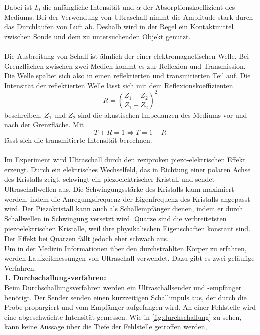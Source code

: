 Dabei ist $I_0$ die anfängliche Intensität und $\alpha$ der Absorptionskoeffizient des Mediums. Bei der Verwendung von Ultraschall nimmt die Amplitude stark durch das 
Durchlaufen von Luft ab. Deshalb wird in der Regel ein Kontaktmittel zwischen Sonde und dem zu untersuchenden Objekt genutzt.\\
\\
Die Ausbreitung von Schall ist ähnlich der einer elektromagnetischen Welle. Bei Grenzflächen zwischen zwei Medien kommt es zur Reflexion und Transmission. Die Welle spaltet 
sich also in einen reflektierten und transmitierten Teil auf. Die Intensität der reflektierten Welle lässt sich mit dem Reflexionskoeffizienten
\begin{equation*}
    R = (\frac{Z_1 - Z_2}{Z_1 + Z_2})^2
\end{equation*}
beschreiben. $Z_1$ und $Z_2$ sind die akustischen Impedanzen des Mediums vor und nach der Grenzfläche. Mit 
\begin{equation*}
    T + R = 1 \Leftrightarrow T = 1 - R
\end{equation*}
lässt sich die transmitierte Intensität berechnen.
\\
\\
Im Experiment wird Ultraschall durch den reziproken piezo-elektrischen Effekt erzeugt. 
Durch ein elektrisches Wechselfeld, das in Richtung einer polaren Achse des Kristalls zeigt, schwingt ein piezoelektrischer Kristall und sendet Ultraschallwellen aus.
Die Schwingungsstärke des Kristalls kann maximiert werden, indem die Anregungsfrequenz der Eigenfrequenz des Kristalls angepasst wird. 
Der Piezokristall kann auch als Schallempfänger dienen, 
indem er durch Schallwellen in Schwingung versetzt wird. Quarze sind die verbreitetsten piezoelektrischen Kristalle, 
weil ihre physikalischen Eigenschaften konstant sind. Der Effekt bei Quarzen fällt jedoch eher schwach aus.\\
\newpage
Um in der Medizin Informationen über den durchstrahlten Körper zu erfahren, werden Laufzeitmessungen von Ultraschall
verwendet. Dazu gibt es zwei geläufige Verfahren:\\
\textbf{1. Durchschallungsverfahren:}\\
Beim Durchschallungsverfahren werden ein Ultraschallsender und -empfänger benötigt. Der Sender senden einen kurzzeitigen
Schallimpuls aus, der durch die Probe propargiert und vom Empfänger aufgefangen wird. An einer Fehlstelle wird eine abgeschwächte Intensität gemessen.
Wie in \autoref{fig:durchschallung} zu sehen, kann keine Aussage über die Tiefe der Fehlstelle getroffen werden,
